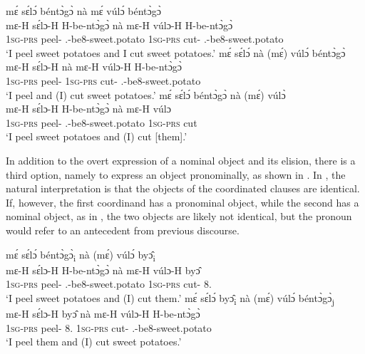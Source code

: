 \ea\label{Coordobj} 
\ea\label{Coordobj1}
\glll mɛ́ sɛ́lɔ́ béntɔ̀gɔ̀ nà mɛ́ vúlɔ́ béntɔ̀gɔ̀\\
 mɛ-H sɛ́lɔ-H H-be-ntɔ̀gɔ̀ nà mɛ-H vúlɔ-H H-be-ntɔ̀gɔ̀\\
1\textsc{sg}-\textsc{prs} peel-{\R} {\OBJ}.{\LINK}-be8-sweet.potato {\CONJ} 1\textsc{sg}-\textsc{prs} cut-{\R} {\OBJ}.{\LINK}-be8-sweet.potato \\
\trans `I peel sweet potatoes and I cut sweet potatoes.'
\ex\label{Coordobj2}
\glll mɛ́ sɛ́lɔ́ nà (mɛ́) vúlɔ́ béntɔ̀gɔ̀\\
 mɛ-H sɛ́lɔ-H nà mɛ-H vúlɔ-H H-be-ntɔ̀gɔ̀\\
1\textsc{sg}-\textsc{prs} peel-{\R} {\CONJ} 1\textsc{sg}-\textsc{prs} cut-{\R} {\OBJ}.{\LINK}-be8-sweet.potato \\
\trans `I peel and (I) cut sweet potatoes.'
\ex\label{Coordobj3}
\glll mɛ́ sɛ́lɔ́ béntɔ̀gɔ̀ nà (mɛ́) vúlɔ̀\\
 mɛ-H sɛ́lɔ-H H-be-ntɔ̀gɔ̀ nà mɛ-H vúlɔ\\
1\textsc{sg}-\textsc{prs} peel-{\R} {\OBJ}.{\LINK}-be8-sweet.potato {\CONJ} 1\textsc{sg}-\textsc{prs} cut \\
\trans `I peel sweet potatoes and (I) cut [them].'
\z
\z

In addition to the overt expression of a nominal object and its elision, there is a third option, namely to express an object pronominally, as shown in . In , the natural interpretation is that the objects of the coordinated clauses are identical. If, however, the first coordinand has a pronominal object, while the second has a nominal object, as in , the two objects are likely not identical, but the pronoun would refer to an antecedent from previous discourse.



\ea\label{Coordobjb} 
\ea\label{Coordobj4}
\glll mɛ́ sɛ́lɔ́ béntɔ̀gɔ̀\textsubscript{i} nà (mɛ́) vúlɔ́ byɔ̂\textsubscript{i} \\
mɛ-H sɛ́lɔ-H H-be-ntɔ̀gɔ̀ nà mɛ-H vúlɔ-H byɔ̂ \\
1\textsc{sg}-\textsc{prs} peel-{\R} {\OBJ}.{\LINK}-be8-sweet.potato {\CONJ} 1\textsc{sg}-\textsc{prs} cut-{\R} 8.{\OBJ} \\
\trans `I peel sweet potatoes and (I) cut them.'
\ex\label{Coordobj5}
\glll mɛ́ sɛ́lɔ́ byɔ̂\textsubscript{i} nà (mɛ́) vúlɔ́  béntɔ̀gɔ̀\textsubscript{j} \\
mɛ-H sɛ́lɔ-H  byɔ̂  nà mɛ-H vúlɔ-H H-be-ntɔ̀gɔ̀ \\
 1\textsc{sg}-\textsc{prs} peel-{\R} 8.{\OBJ} {\CONJ} 1\textsc{sg}-\textsc{prs} cut-{\R} {\OBJ}.{\LINK}-be8-sweet.potato  \\
\trans `I peel them and (I) cut sweet potatoes.'
\z
\z


